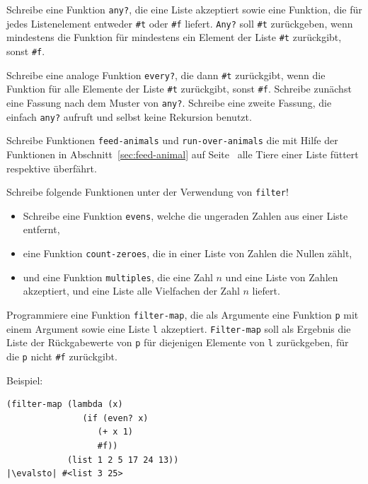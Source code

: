 \begin{aufgabe}
  Schreibe eine Funktion \lstinline{any?}, die eine Liste akzeptiert
  sowie eine Funktion, die für jedes Listenelement entweder
  \lstinline{#t} oder \lstinline{#f} liefert.  \lstinline{Any?} soll
  \lstinline{#t}
  zurückgeben, wenn mindestens die Funktion für mindestens ein Element
  der Liste \lstinline{#t} zurückgibt, sonst \lstinline{#f}.  

  Schreibe eine analoge Funktion
  \lstinline{every?}, die dann \lstinline{#t} zurückgibt, wenn die Funktion
  für alle Elemente der Liste \lstinline{#t} zurückgibt, sonst \lstinline{#f}.
  Schreibe zunächst eine Fassung nach dem Muster von \lstinline{any?}.
  Schreibe eine zweite Fassung, die einfach \lstinline{any?} aufruft
  und selbst keine Rekursion benutzt.
\end{aufgabe}

\begin{aufgabe}
  Schreibe Funktionen \lstinline{feed-animals} und
  \lstinline{run-over-animals} die mit Hilfe der Funktionen in
  Abschnitt~\ref{sec:feed-animal} auf Seite~\pageref{sec:feed-animal}
  alle Tiere einer Liste
  füttert respektive überfährt.
\end{aufgabe}

\begin{aufgabe}
  Schreibe folgende Funktionen unter der  
  Verwendung von \lstinline{filter}!
  \begin{itemize}
    \item Schreibe eine Funktion \lstinline{evens}, welche die ungeraden Zahlen aus 
      einer Liste entfernt,
  \item eine Funktion \lstinline{count-zeroes}, die in einer Liste von
    Zahlen die Nullen zählt,
  \item und eine Funktion \lstinline{multiples}, die eine Zahl $n$ und
    eine Liste von Zahlen akzeptiert, und eine Liste alle Vielfachen
    der Zahl $n$ liefert.
  \end{itemize}
\end{aufgabe}

\begin{aufgabe}
  Programmiere eine Funktion
  \lstinline{filter-map}, die als Argumente eine Funktion \lstinline{p} mit
  einem Argument sowie eine Liste \lstinline{l} akzeptiert.
  \lstinline{Filter-map} soll als Ergebnis die Liste der Rückgabewerte
  von \lstinline{p} für diejenigen Elemente von \lstinline{l} zurückgeben,
  für die \lstinline{p} nicht \lstinline{#f} zurückgibt.

  Beispiel:

\begin{lstlisting}
(filter-map (lambda (x)
               (if (even? x)
                  (+ x 1)
                  #f))
            (list 1 2 5 17 24 13))
|\evalsto| #<list 3 25>
\end{lstlisting}
\end{aufgabe}

